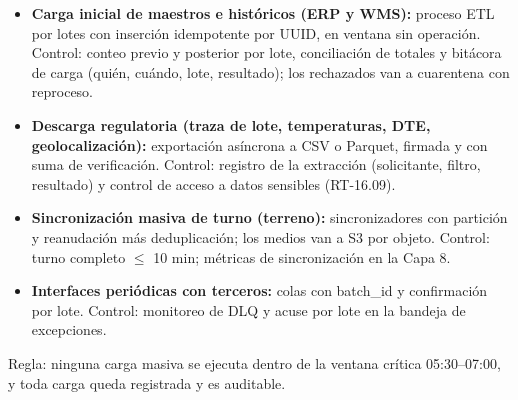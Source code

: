 \begin{itemize}
  \item \textbf{Carga inicial de maestros e históricos (ERP y WMS):} proceso ETL por lotes con inserción idempotente por UUID, en ventana sin operación. Control: conteo previo y posterior por lote, conciliación de totales y bitácora de carga (quién, cuándo, lote, resultado); los rechazados van a cuarentena con reproceso.
  \item \textbf{Descarga regulatoria (traza de lote, temperaturas, DTE, geolocalización):} exportación asíncrona a CSV o Parquet, firmada y con suma de verificación. Control: registro de la extracción (solicitante, filtro, resultado) y control de acceso a datos sensibles (RT-16.09).
  \item \textbf{Sincronización masiva de turno (terreno):} sincronizadores con partición y reanudación más deduplicación; los medios van a S3 por objeto. Control: turno completo $\leq$ 10 min; métricas de sincronización en la Capa 8.
  \item \textbf{Interfaces periódicas con terceros:} colas con batch\_id y confirmación por lote. Control: monitoreo de DLQ y acuse por lote en la bandeja de excepciones.
\end{itemize}

Regla: ninguna carga masiva se ejecuta dentro de la ventana crítica 05:30--07:00, y toda carga queda registrada y es auditable.
